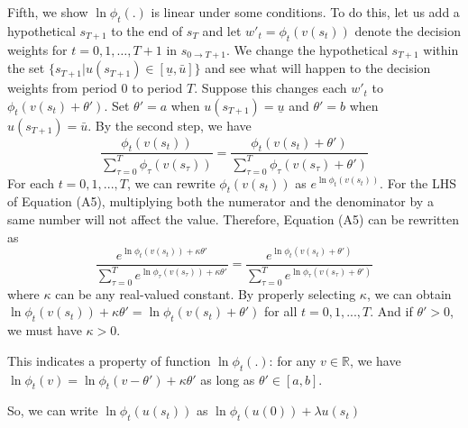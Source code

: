 Fifth, we show \(\ln \phi_t(.)\) is linear under some conditions. To do
this, let us add a hypothetical \(s_{T+1}\) to the end of \(s_T\) and
let \(w'_t=\phi_t(v(s_t))\) denote the decision weights for
\(t=0,1,…,T+1\) in \(s_{0\rightarrow T+1}\). We change the hypothetical
\(s_{T+1}\) within the set
\(\{s_{T+1}|u(s_{T+1})\in[\underline{u},\bar{u}]\}\) and see what will
happen to the decision weights from period 0 to period \(T\). Suppose
this changes each \(w'_t\) to \(\phi_t(v(s_t)+\theta')\). Set
\(\theta'=a\) when \(u(s_{T+1})=\underline{u}\) and \(\theta'=b\) when
\(u(s_{T+1})=\bar{u}\). By the second step, we have\[\tag{A5}
\frac{\phi_t(v(s_t))}{\sum_{\tau=0}^{T}\phi_\tau(v(s_\tau))} = \frac{\phi_t(v(s_t)+\theta')}{\sum_{\tau=0}^{T}\phi_\tau(v(s_\tau)+\theta')}
\]For each \(t=0,1,...,T\), we can rewrite \(\phi_t(v(s_t))\) as
\(e^{\ln \phi_t(v(s_t))}\). For the LHS of Equation (A5), multiplying
both the numerator and the denominator by a same number will not affect
the value. Therefore, Equation (A5) can be rewritten as \[
\frac{e^{\ln\phi_t(v(s_t))+\kappa\theta'}}{\sum_{\tau=0}^{T}e^{\ln\phi_\tau(v(s_\tau))+\kappa\theta'}} = \frac{e^{\ln\phi_t(v(s_t)+\theta')}}{\sum_{\tau=0}^{T}e^{\ln\phi_\tau(v(s_\tau)+\theta')}}
\]where \(\kappa\) can be any real-valued constant. By properly
selecting \(\kappa\), we can obtain
\(\ln \phi_t(v(s_t))+\kappa\theta'=\ln \phi_t(v(s_t)+\theta')\) for all
\(t=0,1,...,T\). And if \(\theta'>0\), we must have \(\kappa>0\).

This indicates a property of function \(\ln \phi_t(.)\): for any
\(v\in \mathbb{R}\), we have
\(\ln \phi_t(v)=\ln \phi_t(v-\theta')+\kappa\theta'\) as long as
\(\theta' \in [a,b]\).

So, we can write \(\ln \phi_t (u(s_t))\) as
\(\ln \phi_t(u(0))+\lambda u(s_t)\)
